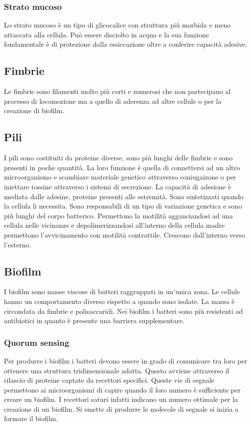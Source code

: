 		\subsubsection{Strato mucoso}
		Lo strato mucoso \`e un tipo di glicocalice con struttura pi\`u morbida e meno attaccata alla cellula.
		Pu\`o essere disciolto in acqua e la sua funzione fondamentale \`e di protezione dalla essiccazione oltre a conferire capacit\`a adesive.

	\subsection{Fimbrie}
	Le fimbrie sono filamenti molto pi\`u corti e numerosi che non partecipano al processo di locomozione ma a quello di aderenza ad altre cellule o per la creazione di biofilm.

	\subsection{Pili}
	I pili sono costituiti da proteine diverse, sono pi\`u lunghi delle fimbrie e sono presenti in poche quantit\`a.
	La loro funzione \`e quella di connettersi ad un altro microorganismo e scambiare materiale genetico attraverso coniugaizone o per iniettare tossine attraverso i sistemi di secrezione.
	La capacit\`a di adesione \`e mediata dalle adesine, proteine presenti alle estremit\`a.
	Sono sintetizzati quando la cellula li necessita.
	Sono responsabili di un tipo di variazione genetica e sono pi\`u lunghi del corpo batterico.
	Permettono la motilit\`a agganciandosi ad una cellula nelle vicinanze e depolimerizzandosi all'interno della cellula madre permettono l'avvicinamento con motilit\`a contrattile.
	Crescono dall'interno verso l'esterno.

	\subsection{Biofilm}
	I biofilm sono masse viscose di batteri raggruppati in un'unica zona.
	Le cellule hanno un comportamento diverso rispetto a quando sono isolate.
	La massa \`e circondata da fimbrie e polisaccaridi.
	Nei biofilm i batteri sono pi\`u resistenti ad antibiotici in quanto \`e presente una barriera supplementare.

		\subsubsection{Quorum sensing}
		Per produrre i biofilm i batteri devono essere in grado di comunicare tra loro per ottenere una struttura tridimensionale adatta.
		Questo avviene attraverso il rilascio di proteine captate da recettori specifici.
		Queste vie di segnale permettono ai microorganismi di capire quando il loro numero \`e sufficiente per creare un biofilm.
		I recettori saturi infatti indicano un numero ottimale per la creazione di un biofilm.
		Si smette di produrre le molecole di segnale si inizia a formare il biofilm.

